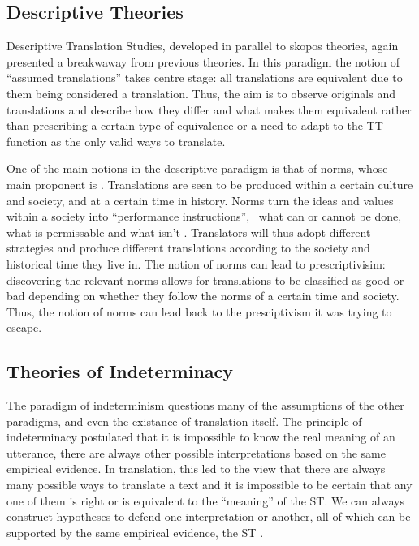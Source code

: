 \subsection{Descriptive Theories}
\label{sub:descriptive}

\noindent Descriptive Translation Studies, developed in parallel to skopos theories, again presented a breakwaway from previous theories. In this paradigm the notion of ``assumed translations'' \parencite{toury1995notion} takes centre stage: all translations are equivalent due to them being considered a translation. Thus, the aim is to observe originals and translations and describe how they differ and what makes them equivalent rather than prescribing a certain type of equivalence or a need to adapt to the \ac{TT} function as the only valid ways to translate.

One of the main notions in the descriptive paradigm is that of norms, whose main proponent is \textcite{toury1995nature}. Translations are seen to be produced within a certain culture and society, and at a certain time in history. Norms turn the ideas and values within a society into ``performance instructions'', \ie\ what can or cannot be done, what is permissable and what isn't \parencite{toury1995nature}. Translators will thus adopt different strategies and produce different translations according to the society and historical time they live in. The notion of norms can lead to prescriptivisim: discovering the relevant norms allows for translations to be classified as good or bad depending on whether they follow the norms of a certain time and society. Thus, the notion of norms can lead back to the presciptivism it was trying to escape. 

\subsection{Theories of Indeterminacy}

\noindent The paradigm of indeterminism questions many of the assumptions of the other paradigms, and even the existance of translation itself. The principle of indeterminacy \parencite{quine1969linguistics} postulated that it is impossible to know the real meaning of an utterance, there are always other possible interpretations based on the same empirical evidence. In translation, this led to the view that there are always many possible ways to translate a text and it is impossible to be certain that any one of them is right or is equivalent to the ``meaning'' of the \ac{ST}. We can always construct hypotheses to defend one interpretation or another, all of which can be supported by the same empirical evidence, \ie the \ac{ST} \parencite{quine1969linguistics}.

